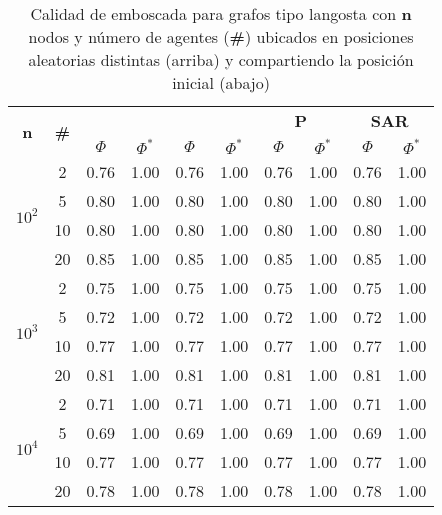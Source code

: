 \begin{table}
	\caption{Calidad de emboscada para grafos tipo langosta
	con \textbf{n} nodos y n\'umero de agentes
	(\textbf{\#}) ubicados en posiciones aleatorias distintas (arriba) y
	compartiendo la posici\'on inicial (abajo)}
	\label{tab:ambush_lobster}
	\centering
	\begin{small}
		\setlength{\tabcolsep}{4pt}
		\begin{tabular}{|c|c|cc|cc|cc|cc|}
			\hline
			\multirow{2}{*}{\textbf{n}} &
			\multirow{2}{*}{\textbf{\#}} &
			\multicolumn{2}{c|}{\textbf{\astar}} &
			\multicolumn{2}{c|}{\textbf{\ambush}} &
			\multicolumn{2}{c|}{\textbf{P}} &
			\multicolumn{2}{c|}{\textbf{SAR}}\\
			& & $\Phi$ & $\Phi^*$ & $\Phi$ & $\Phi^*$&
			$\Phi$ & $\Phi^*$& $\Phi$ & $\Phi^*$\\
			\hline
			\multirow{4}{*}{$10^2$}
			 & 2 & 0.76 & 1.00 & 0.76 & 1.00 & 0.76 & 1.00 & 0.76 & 1.00\\
			 & 5 & 0.80 & 1.00 & 0.80 & 1.00 & 0.80 & 1.00 & 0.80 & 1.00\\
			 & 10 & 0.80 & 1.00 & 0.80 & 1.00 & 0.80 & 1.00 & 0.80 & 1.00\\
			 & 20 & 0.85 & 1.00 & 0.85 & 1.00 & 0.85 & 1.00 & 0.85 & 1.00\\
			\hline
			\multirow{4}{*}{$10^3$}
			 & 2 & 0.75 & 1.00 & 0.75 & 1.00 & 0.75 & 1.00 & 0.75 & 1.00\\
			 & 5 & 0.72 & 1.00 & 0.72 & 1.00 & 0.72 & 1.00 & 0.72 & 1.00\\
			 & 10 & 0.77 & 1.00 & 0.77 & 1.00 & 0.77 & 1.00 & 0.77 & 1.00\\
			 & 20 & 0.81 & 1.00 & 0.81 & 1.00 & 0.81 & 1.00 & 0.81 & 1.00\\
			 \hline
			\multirow{4}{*}{$10^4$}
			 & 2 & 0.71 & 1.00 & 0.71 & 1.00 & 0.71 & 1.00 & 0.71 & 1.00\\
			 & 5 & 0.69 & 1.00 & 0.69 & 1.00 & 0.69 & 1.00 & 0.69 & 1.00\\
			 & 10 & 0.77 & 1.00 & 0.77 & 1.00 & 0.77 & 1.00 & 0.77 & 1.00\\
			 & 20 & 0.78 & 1.00 & 0.78 & 1.00 & 0.78 & 1.00 & 0.78 & 1.00\\
			 \hline
		\end{tabular}
		

\end{small}
\end{table}

